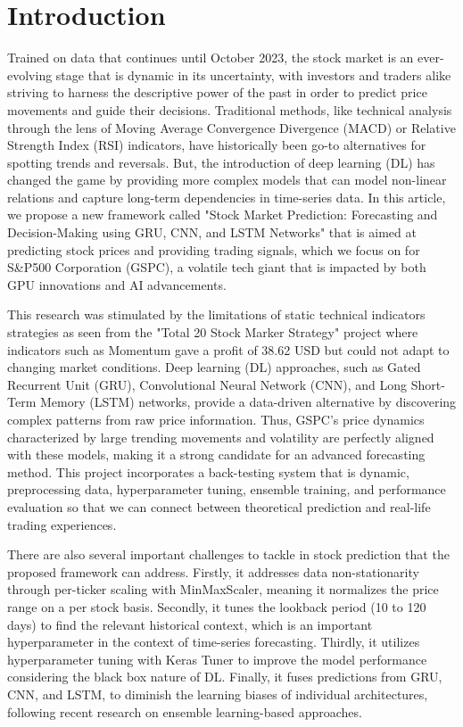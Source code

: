 \section{Introduction}
Trained on data that continues until October 2023, the stock market is an ever-evolving stage that is dynamic in its uncertainty, with investors and traders alike striving to harness the descriptive power of the past in order to predict price movements and guide their decisions. Traditional methods, like technical analysis through the lens of Moving Average Convergence Divergence (MACD) or Relative Strength Index (RSI) indicators, have historically been go-to alternatives for spotting trends and reversals. But, the introduction of deep learning (DL) has changed the game by providing more complex models that can model non-linear relations and capture long-term dependencies in time-series data. In this article, we propose a new framework called "Stock Market Prediction: Forecasting and Decision-Making using GRU, CNN, and LSTM Networks" that is aimed at predicting stock prices and providing trading signals, which we focus on for S\&P500 Corporation (GSPC), a volatile tech giant that is impacted by both GPU innovations and AI advancements.

This research was stimulated by the limitations of static technical indicators strategies as seen from the "Total 20 Stock Marker Strategy" project where indicators such as Momentum gave a profit of 38.62 USD but could not adapt to changing market conditions. Deep learning (DL) approaches, such as Gated Recurrent Unit (GRU), Convolutional Neural Network (CNN), and Long Short-Term Memory (LSTM) networks, provide a data-driven alternative by discovering complex patterns from raw price information. Thus, GSPC’s price dynamics characterized by large trending movements and volatility are perfectly aligned with these models, making it a strong candidate for an advanced forecasting method. This project incorporates a back-testing system that is dynamic, preprocessing data, hyperparameter tuning, ensemble training, and performance evaluation so that we can connect between theoretical prediction and real-life trading experiences.

There are also several important challenges to tackle in stock prediction that the proposed framework can address. Firstly, it addresses data non-stationarity through per-ticker scaling with MinMaxScaler, meaning it normalizes the price range on a per stock basis. Secondly, it tunes the lookback period (10 to 120 days) to find the relevant historical context, which is an important hyperparameter in the context of time-series forecasting. Thirdly, it utilizes hyperparameter tuning with Keras Tuner to improve the model performance considering the black box nature of DL. Finally, it fuses predictions from GRU, CNN, and LSTM, to diminish the learning biases of individual architectures, following recent research on ensemble learning-based approaches.

